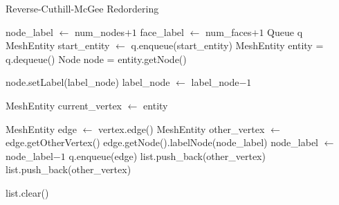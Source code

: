 \documentclass{article}
\begin{document}
        
\begin{algorithm}[ht]
\caption{Reverse-Cuthill-McGee Redordering}\label{RCM}
\begin{algorithmic}
    \State node\_label $\gets$ num\_nodes$ + 1$
    \State face\_label $\gets$ num\_faces$ + 1$
    \State Queue q
    \State MeshEntity start\_entity $\gets$ 
    \State q.enqueue(start\_entity)
        \State MeshEntity entity = q.dequeue()
        \State Node node = entity.getNode()

            \State node.setLabel(label\_node)
            \State label\_node $\gets$ label\_node$ - 1$
        \EndIf

            \State {}
            \State MeshEntity current\_vertex $\gets$ entity 

                MeshEntity edge $\gets$ vertex.edge()
                \For{}
                    \State
                \EndFor
                \State MeshEntity other\_vertex $\gets$ edge.getOtherVertex()
                        \State edge.getNode().labelNode(node\_label)
                        \State node\_label $\gets$ node\_label$ - 1$
                    \Else
                        \State q.enqueue(edge)
                        \State list.push\_back(other\_vertex)
                    \EndIf
                \Else
                        \State list.push\_back(other\_vertex)
                    \EndIf
                \EndIf
            \EndFor

            \State {}
            \State list.clear()

        \EndIf

    \EndWhile
\EndProcedure

\end{algorithmic}
\end{algorithm}
\end{document}
